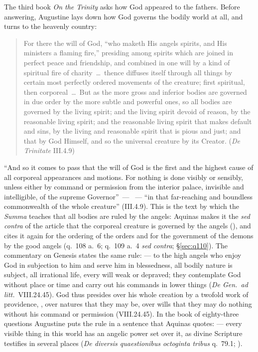 The third book \emph{On the Trinity} asks how God appeared to the
fathers. Before answering, Augustine lays down how God governs the bodily
world at all, and turns to the heavenly country:
\begin{quote}
For there the will of God, ``who maketh His angels spirits, and His
ministers a flaming fire,'' presiding among spirits which are joined in
perfect peace and friendship, and combined in one will by a kind of
spiritual fire of charity~\dots\ thence diffuses itself through all
things by certain most perfectly ordered movements of the creature; first
spiritual, then corporeal~\dots\ But as the more gross and
inferior bodies are governed in due order by the more subtle and powerful
ones, so all bodies are governed by the living spirit; and the living
spirit devoid of reason, by the reasonable living spirit; and the
reasonable living spirit that makes default and sins, by the living and
reasonable spirit that is pious and just; and that by God Himself, and so
the universal creature by its Creator. (\emph{De Trinitate} III.4.9)
\end{quote}
``And so it comes to pass that the will of God is the first and the
highest cause of all corporeal appearances and motions. For nothing is
done visibly or sensibly, unless either by command or permission from the
interior palace, invisible and intelligible, of the supreme Governor''~---
~--- ``in that far-reaching and boundless commonwealth of the
whole creature'' (III.4.9). This is the text by which the \emph{Summa}
teaches that all bodies are ruled by the angels: Aquinas makes it the
\emph{sed contra} of the article that the corporeal creature is governed
by the angels (), and cites it again for the ordering
of the orders and for the government of the demons by the good angels
(q.~108 a.~6; q.~109 a.~4 \emph{sed contra}; \S\ref{sec:q110}). The
commentary on Genesis states
the same rule:  --- to the high angels who
enjoy God in subjection to him and serve him in blessedness, all bodily
nature is subject, all irrational life, every will weak or depraved;
they contemplate God without place or time and carry out his commands in
lower things (\emph{De Gen.\ ad litt.}\ VIII.24.45). God thus presides over his whole
creation by a twofold work of providence, , over
natures that they may be, over wills that they may do nothing without his
command or permission (VIII.24.45). In the
book of eighty-three questions Augustine puts the rule in a sentence that
Aquinas quotes:  --- every visible thing in this world has an angelic
power set over it, as divine Scripture testifies in several places
(\emph{De diversis quaestionibus octoginta tribus} q.~79.1; ).

